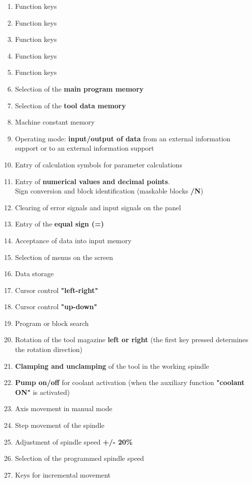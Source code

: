 \begin{enumerate}
    \item Function keys
    \item Function keys
    \item Function keys
    \item Function keys
    \item Function keys
    \item Selection of the \textbf{main program memory}
    \item Selection of the \textbf{tool data memory}
    \item Machine constant memory
    \item Operating mode: \textbf{input/output of data} from an external information support or to an external information support
    \item Entry of calculation symbols for parameter calculations
    \item Entry of \textbf{numerical values and decimal points}. \\Sign conversion and block identification (maskable blocks \textbf{/N})
    \item Clearing of error signals and input signals on the panel
    \item Entry of the \textbf{equal sign (=)}
    \item Acceptance of data into input memory
    \item Selection of menus on the screen
    \item Data storage
    \item Cursor control \textbf{"left-right"}
    \item Cursor control \textbf{"up-down"}
    \item Program or block search
    \item Rotation of the tool magazine \textbf{left or right} (the first key pressed determines the rotation direction)
    \item \textbf{Clamping and unclamping} of the tool in the working spindle
    \item \textbf{Pump on/off} for coolant activation (when the auxiliary function \textbf{"coolant ON"} is activated)
    \item Axis movement in manual mode
    \item Step movement of the spindle
    \item Adjustment of spindle speed \textbf{+/- 20\%}
    \item Selection of the programmed spindle speed
    \item Keys for incremental movement

\end{enumerate}

